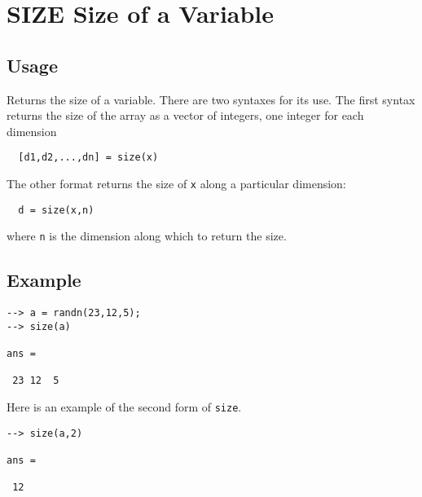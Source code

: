 \section{SIZE Size of a Variable}

\subsection{Usage}

Returns the size of a variable.  There are two syntaxes for its
use.  The first syntax returns the size of the array as a vector
of integers, one integer for each dimension
\begin{verbatim}
  [d1,d2,...,dn] = size(x)
\end{verbatim}
The other format returns the size of \verb|x| along a particular
dimension:
\begin{verbatim}
  d = size(x,n)
\end{verbatim}
where \verb|n| is the dimension along which to return the size.
\subsection{Example}

\begin{verbatim}
--> a = randn(23,12,5);
--> size(a)

ans = 

 23 12  5 
\end{verbatim}
Here is an example of the second form of \verb|size|.
\begin{verbatim}
--> size(a,2)

ans = 

 12 
\end{verbatim}
